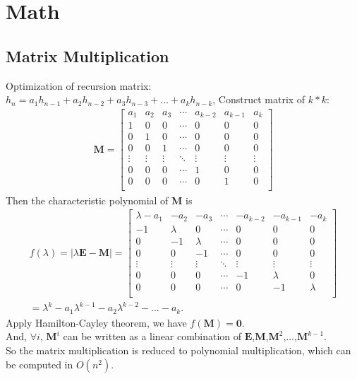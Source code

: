 \documentclass[10pt]{article}
\begin{document}
\section{Math}
\subsection{Matrix Multiplication}

Optimization of recursion matrix: \\
$h_n=a_1h_{n-1}+a_2h_{n-2}+a_3h_{n-3}+ \ldots + a_kh_{n-k}$, Construct matrix of $k*k$:
\begin{gather*}
\mathbf{M} =
\begin{bmatrix}
a_1 & a_2 & a_3 & \cdots & a_{k-2} & a_{k-1} & a_k \\
1 & 0 & 0 & \cdots & 0 & 0 & 0 \\
0 & 1 & 0 & \cdots & 0 & 0 & 0 \\
0 & 0 & 1 & \cdots & 0 & 0 & 0 \\
\vdots & \vdots & \vdots & \ddots & \vdots & \vdots & \vdots \\
0 & 0 & 0 & \cdots & 1 & 0 & 0 \\
0 & 0 & 0 & \cdots & 0 & 1 & 0 \\
\end{bmatrix}
\end{gather*}
Then the characteristic polynomial of $\mathbf{M}$ is
\begin{gather*}
f(\lambda)=|\lambda \mathbf{E} - \mathbf{M}| =
\begin{bmatrix}
\lambda - a_1 & -a_2 & -a_3 & \cdots & -a_{k-2} & -a_{k-1} & -a_k \\
-1 & \lambda & 0 & \cdots & 0 & 0 & 0 \\
0 & -1 & \lambda & \cdots & 0 & 0 & 0 \\
0 & 0 & -1 & \cdots & 0 & 0 & 0 \\
\vdots & \vdots & \vdots & \ddots & \vdots & \vdots & \vdots \\
0 & 0 & 0 & \cdots & -1 & \lambda & 0 \\
0 & 0 & 0 & \cdots & 0 & -1 & \lambda \\
\end{bmatrix}
\\
=\lambda ^k - a_1 \lambda ^ {k-1} - a_2 \lambda ^ {k-2} - \ldots - a_k.
\end{gather*}
Apply Hamilton-Cayley theorem, we have $f(\mathbf{M})=\mathbf{0}$. \\
And, $\forall i$, $\mathbf{M} ^ i$ can be written as a linear combination of $\mathbf{E}$,$\mathbf{M}$,$\mathbf{M} ^2$,$\ldots$,$\mathbf{M} ^ {k-1}$.\\
So the matrix multiplication is reduced to polynomial multiplication, which can be computed in $O(n^2)$.
\end{document}
